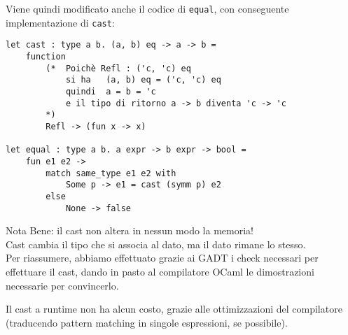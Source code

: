 \documentclass{article}
\begin{document}
Viene quindi modificato anche il codice di \texttt{equal}, con conseguente implementazione di \texttt{cast}:
\begin{tcolorbox}
\begin{verbatim}
let cast : type a b. (a, b) eq -> a -> b =
    function
        (*  Poichè Refl : ('c, 'c) eq
            si ha   (a, b) eq = ('c, 'c) eq
            quindi  a = b = 'c
            e il tipo di ritorno a -> b diventa 'c -> 'c
        *)
        Refl -> (fun x -> x)

let equal : type a b. a expr -> b expr -> bool = 
    fun e1 e2 ->
        match same_type e1 e2 with
            Some p -> e1 = cast (symm p) e2
        else
            None -> false
\end{verbatim}
\end{tcolorbox}
Nota Bene: il cast non altera in nessun modo la memoria!\\
Cast cambia il tipo che si associa al dato, ma il dato rimane lo stesso.\vspace{14pt}\\
Per riassumere, abbiamo effettuato grazie ai GADT i check necessari per effettuare il cast, dando in pasto al compilatore OCaml le dimostrazioni necessarie per convincerlo. 

Il cast a runtime non ha alcun costo, grazie alle ottimizzazioni del compilatore (traducendo pattern matching in singole espressioni, se possibile).
\end{document}
